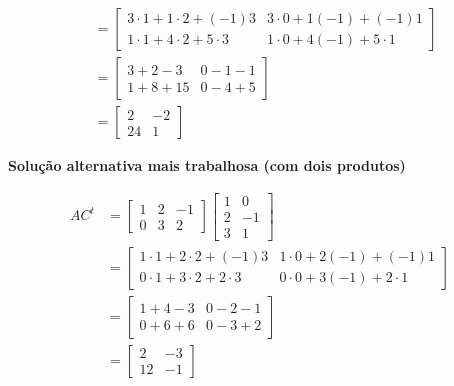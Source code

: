 \documentclass[a4paper,12pt,fleqn]{article}
\begin{document}
\begin{answer}
\begin{align*}
    & =
      \begin{bmatrix}
        3 \cdot 1 + 1 \cdot 2 + (-1) 3 &
        3 \cdot 0 + 1 (-1)    + (-1) 1
        \\
        1 \cdot 1 + 4 \cdot 2 +  5 \cdot 3 &
        1 \cdot 0 + 4 (-1)    +  5 \cdot 1
      \end{bmatrix}
    \\[2mm]
    & =
      \begin{bmatrix}
        3 + 2 -  3 & 0 - 1 - 1 \\
        1 + 8 + 15 & 0 - 4 + 5
      \end{bmatrix}
    \\[2mm]
    & =
      \begin{bmatrix}
        2 & -2 \\
        24 & 1
      \end{bmatrix}
  \end{align*}

  \clearpage
  \textbf{Solução alternativa mais trabalhosa (com dois produtos)}

  \begin{align*}
    AC^t
    & =
      \begin{bmatrix}
        1 & 2 & -1 \\
        0 & 3 &  2
      \end{bmatrix}
      \begin{bmatrix}
        1 &  0 \\
        2 & -1 \\
        3 &  1
      \end{bmatrix}
    \\[2mm]
    & =
      \begin{bmatrix}
        1 \cdot 1 + 2 \cdot 2 + (-1) 3 &
        1 \cdot 0 + 2 (-1)    + (-1) 1
        \\
        0 \cdot 1 + 3 \cdot 2 +  2 \cdot 3 &
        0 \cdot 0 + 3 (-1)    +  2 \cdot 1
      \end{bmatrix}
    \\[2mm]
    & =
      \begin{bmatrix}
        1 + 4 - 3 & 0 - 2 - 1 \\
        0 + 6 + 6 & 0 - 3 + 2
      \end{bmatrix}
    \\[2mm]
    & =
      \begin{bmatrix}
         2 & -3 \\
        12 & -1
      \end{bmatrix}
  \end{align*}


\end{answer}
\end{document}
